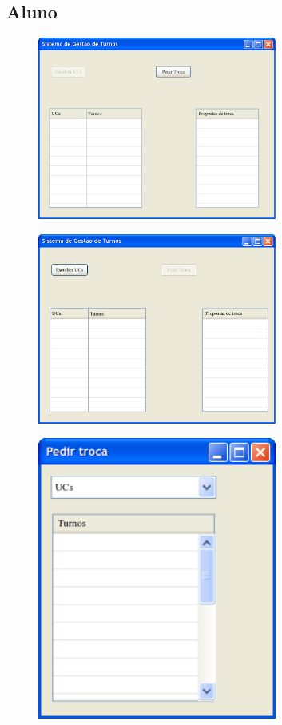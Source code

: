 \documentclass[12pt,a4paper]{report}
\begin{document}
\begin{appendices}
\section{Aluno}
\begin{figure}[H]
	\centering 
	\includegraphics[width=0.7\textwidth]{modelacao/mockups/aluno11111.png}  
\end{figure}
	
\begin{figure}[H]
	\centering 
	\includegraphics[width=0.7\textwidth]{modelacao/mockups/aluno11110.png}  
\end{figure}

\begin{figure}[H]
	\centering 
	\includegraphics[width=0.7\textwidth]{modelacao/mockups/alunopedirtroca.png}  
\end{figure}


\end{appendices}
\end{document}
